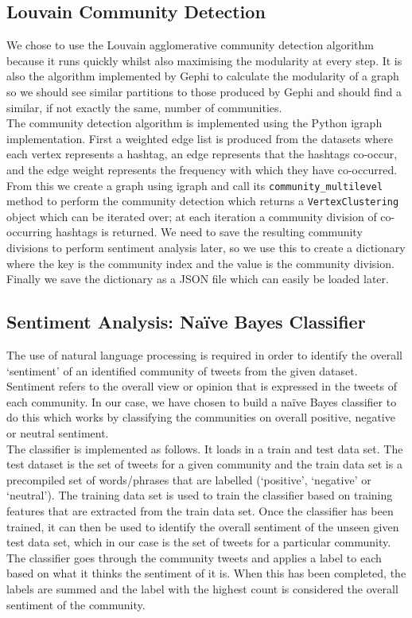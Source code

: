 \documentclass[conference]{IEEEtran}
\begin{document}
	\subsection{Louvain Community Detection}
		{
			We chose to use the Louvain agglomerative community detection algorithm \cite{louvain} because it runs quickly whilst also maximising the modularity at every step. It is also the algorithm implemented by Gephi to calculate the modularity of a graph so we should see similar partitions to those produced by Gephi and should find a similar, if not exactly the same, number of communities. \\
			
			The community detection algorithm is implemented using the Python igraph \cite{igraph} implementation. First a weighted edge list is produced from the datasets where each vertex represents a hashtag, an edge represents that the hashtags co-occur, and the edge weight represents the frequency with which they have co-occurred. From this we create a graph using igraph and call its \texttt{community\_multilevel} method to perform the community detection which returns a \texttt{VertexClustering} object which can be iterated over; at each iteration a community division of co-occurring hashtags is returned. We need to save the resulting community divisions to perform sentiment analysis later, so we use this to create a dictionary where the key is the community index and the value is the community division. Finally we save the dictionary as a JSON file which can easily be loaded later.
		\par}
	
	\subsection{Sentiment Analysis: Naïve Bayes Classifier}
		{
			The use of natural language processing is required in order to identify the overall ‘sentiment’ of an identified community of tweets from the given dataset. Sentiment refers to the overall view or opinion that is expressed in the tweets of each community. In our case, we have chosen to build a naïve Bayes classifier to do this which works by classifying the communities on overall positive, negative or neutral sentiment. \\
			
The classifier is implemented as follows. It loads in a train and test data set. The test dataset is the set of tweets for a given community and the train data set is a precompiled set of words/phrases that are labelled (‘positive’, ‘negative’ or ‘neutral’). The training data set is used to train the classifier based on training features that are extracted from the train data set. Once the classifier has been trained, it can then be used to identify the overall sentiment of the unseen given test data set, which in our case is the set of tweets for a particular community. The classifier goes through the community tweets and applies a label to each based on what it thinks the sentiment of it is. When this has been completed, the labels are summed and the label with the highest count is considered the overall sentiment of the community.
		\par}
\end{document}
